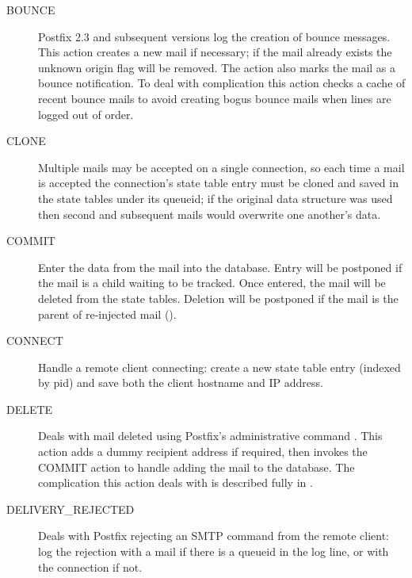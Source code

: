 \begin{description}

    \item [BOUNCE] Postfix 2.3 and subsequent versions log the creation of
        bounce messages.  This action creates a new mail if necessary; if
        the mail already exists the unknown origin flag will be removed.
        The action also marks the mail as a bounce notification.  To deal
        with complication  this action checks a cache of
        recent bounce mails to avoid creating bogus bounce mails when lines
        are logged out of order.

    \item [CLONE] Multiple mails may be accepted on a single connection, so
        each time a mail is accepted the connection's state table entry
        must be cloned and saved in the state tables under its queueid; if
        the original data structure was used then second and subsequent
        mails would overwrite one another's data.

    \item [COMMIT] Enter the data from the mail into the database. Entry
        will be postponed if the mail is a child waiting to be tracked.
        Once entered, the mail will be deleted from the state tables.
        Deletion will be postponed if the mail is the parent of re-injected
        mail ().

    \item [CONNECT] Handle a remote client connecting: create a new state
        table entry (indexed by  \gls{pid}) and save both the
        client hostname and \gls{IP} address.

    \item [DELETE] Deals with mail deleted using Postfix's administrative
        command .  This action adds a dummy recipient
        address if required, then invokes the COMMIT action to handle
        adding the mail to the database.  The complication this action
        deals with is described fully in .  

    \item [DELIVERY\_REJECTED] Deals with Postfix rejecting an \gls{SMTP}
        command from the remote client: log the rejection with a mail if
        there is a queueid in the log line, or with the connection if not.


\end{description}
